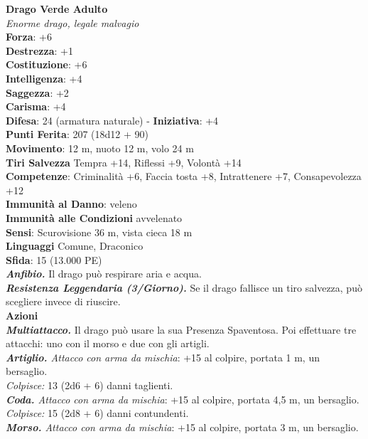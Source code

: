 \begin{multicols}{2}
\medskip\textbf{Drago Verde Adulto}\\
\emph{Enorme drago, legale malvagio}\\
\textbf{Forza}: +6\\
\textbf{Destrezza}: +1\\
\textbf{Costituzione}: +6\\
\textbf{Intelligenza}: +4\\
\textbf{Saggezza}: +2\\
\textbf{Carisma}: +4\\
\textbf{Difesa}: 24 (armatura naturale) - \textbf{Iniziativa}: +4\\
\textbf{Punti Ferita}: 207 (18d12 + 90)\\
\textbf{Movimento}: 12 m, nuoto 12 m, volo 24 m\\
\textbf{Tiri Salvezza} Tempra +14, Riflessi +9, Volontà +14\\
\textbf{Competenze}: Criminalità +6, Faccia tosta +8, Intrattenere +7, Consapevolezza +12\\
\textbf{Immunità al Danno}: veleno\\
\textbf{Immunità alle Condizioni} avvelenato\\
\textbf{Sensi}: Scurovisione 36 m, vista cieca 18 m\\
\textbf{Linguaggi} Comune, Draconico\\
\textbf{Sfida}: 15 (13.000 PE)\smallskip\\
\emph{\textbf{Anfibio.}} Il drago può respirare aria e acqua.\\
\emph{\textbf{Resistenza Leggendaria (3/Giorno).}} Se il drago fallisce un tiro salvezza, può scegliere invece di riuscire.\\
\smallskip\textbf{Azioni}\\
\emph{\textbf{Multiattacco.}} Il drago può usare la sua Presenza Spaventosa. Poi effettuare tre attacchi: uno con il morso e due con gli artigli.\\
\emph{\textbf{Artiglio.} Attacco con arma da mischia}: +15 al colpire, portata 1 m, un bersaglio.\\
\emph{Colpisce:} 13 (2d6 + 6) danni taglienti.\\
\emph{\textbf{Coda.} Attacco con arma da mischia}: +15 al colpire, portata 4,5 m, un bersaglio.\\
\emph{Colpisce:} 15 (2d8 + 6) danni contundenti. \\
\emph{\textbf{Morso.} Attacco con arma da mischia}: +15 al colpire, portata 3 m, un bersaglio.\\

\end{multicols}
